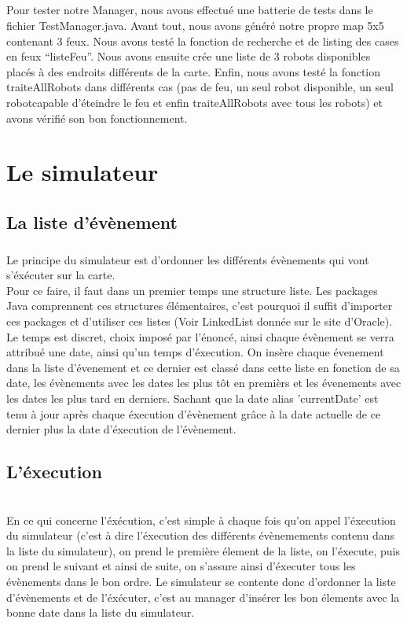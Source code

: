 \documentclass[10pt]{report}
\begin{document}
\paragraph{}Pour tester notre Manager, nous avons effectué une batterie de tests dans le fichier TestManager.java. Avant tout, nous avons généré notre propre map 5x5 contenant 3 feux. Nous avons testé la fonction de recherche et de listing des cases en feux ``listeFeu''. Nous avons ensuite crée une liste de 3 robots disponibles placés à des endroits différents de la carte. Enfin, nous avons testé la fonction traiteAllRobots dans différents cas (pas de feu, un seul robot disponible, un seul robotcapable d'éteindre le feu et enfin traiteAllRobots avec tous les robots) et avons vérifié son bon fonctionnement.  
\chapter{Le simulateur}
\section{La liste d'évènement}
\paragraph{}
Le principe du simulateur est d'ordonner les différents évènements qui vont s'éxécuter sur la carte.\\
Pour ce faire, il faut dans un premier temps une structure liste. Les packages Java comprennent ces structures élémentaires,
c'est pourquoi il suffit d'importer ces packages et d'utiliser ces listes (Voir LinkedList donnée sur le site d'Oracle).
\\ Le temps est discret, choix imposé par l'énoncé, ainsi chaque évènement se verra attribué une date, ainsi qu'un temps d'éxecution.
On insère chaque évenement dans la liste d'évenement et ce dernier est classé dans cette liste en fonction de sa date, 
les évènements avec les dates les plus tôt en premièrs et les évenements avec les dates les plus tard en derniers. 
Sachant que la date alias 'currentDate' est tenu à jour après chaque éxecution d'évènement grâce à la date actuelle de ce dernier
plus la date d'éxecution de l'évènement.

\section{L'éxecution}\\En ce qui concerne l'éxécution, c'est simple à chaque fois qu'on appel l'éxecution du simulateur 
(c'est à dire l'éxecution des différents évènemements contenu dans la liste du simulateur), on prend le première élement 
de la liste, on l'éxecute, puis on prend le suivant et ainsi de suite, on s'assure ainsi d'éxecuter tous les évènements 
dans le bon ordre. Le simulateur se contente donc d'ordonner la liste d'évènements et de l'éxécuter, c'est au manager d'insérer
les bon élements avec la bonne date dans la liste du simulateur.
\end{document}
